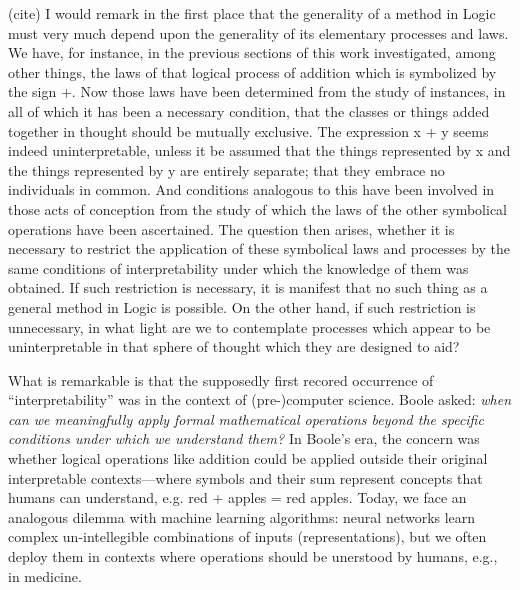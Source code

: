 \begin{displaycquote}[pp.~48]{(cite)}
I would remark in the first place that the generality of a method in Logic
must very much depend upon the generality of its elementary processes and laws.
We have, for instance, in the previous sections of this work investigated, among
other things, the laws of that logical process of addition which is symbolized by
the sign +. Now those laws have been determined from the study of instances,
in all of which it has been a necessary condition, that the classes or things added
together in thought should be mutually exclusive. The expression x + y seems
indeed uninterpretable, unless it be assumed that the things represented by x
and the things represented by y are entirely separate; that they embrace no
individuals in common. And conditions analogous to this have been involved
in those acts of conception from the study of which the laws of the other
symbolical operations have been ascertained. The question then arises, whether
it is necessary to restrict the application of these symbolical laws and processes
by the same conditions of interpretability under which the knowledge of them
was obtained. If such restriction is necessary, it is manifest that no such thing
as a general method in Logic is possible. On the other hand, if such restriction
is unnecessary, in what light are we to contemplate processes which appear to
be uninterpretable in that sphere of thought which they are designed to aid?
\end{displaycquote}
What is remarkable is that the supposedly first recored occurrence of ``interpretability'' was in the context of (pre-)computer science. Boole asked: \textit{when can we meaningfully apply formal mathematical operations beyond the specific conditions under which we understand them?}
In Boole's era, the concern was whether logical operations like addition could be applied outside their original interpretable contexts—where symbols and their sum represent concepts that humans can understand, e.g. red + apples = red apples. Today, we face an analogous dilemma with machine learning algorithms: neural networks learn complex un-intellegible combinations of inputs (representations), but we often deploy them in contexts where operations should be unerstood by humans, e.g., in medicine. 

